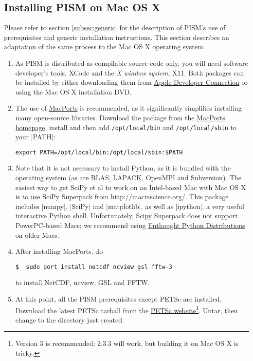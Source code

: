 \documentclass[11pt,final]{amsart}
\begin{document}
\clearpage
\subsection{Installing PISM on Mac OS X}  \label{subsec:macosx}

Please refer to section \ref{subsec:generic} for the description of PISM's use of prerequisites and generic installation
instructions. This section describes an adaptation of the same process to the Mac OS X operating system.

\begin{enumerate}
\item As PISM is distributed as compilable source code only, you will need software developer's tools, XCode and the \emph{X
    window system}, X11. Both packages can be installed by either downloading them from
  \href{http://developer.apple.com/tools/xcode/}{Apple Developer Connection} or using the Mac OS X installation DVD.
\item The use of \href{http://www.macports.org/}{MacPorts} is recommended, as it significantly simplifies installing many
  open-source libraries. Download the package from the \href{http://www.macports.org/install.php}{MacPorts homepage}, install and
  then add \verb|/opt/local/bin| and \verb|/opt/local/sbin| to your |PATH|:
\begin{verbatim}
export PATH=/opt/local/bin:/opt/local/sbin:$PATH
\end{verbatim}
\item Note that it is not necessary to install Python, as it is bundled with the operating system (as are BLAS, LAPACK, OpenMPI and
  Subversion). The easiest way to get SciPy et al to work on an Intel-based Mac with Mac OS X is to use SciPy Superpack from
  \url{http://macinscience.org/}. This package includes |numpy|, |SciPy| and |matplotlib|, as well as |ipython|, a very useful
  interactive Python shell. Unfortunately, Scipy Superpack does not support PowerPC-based Macs; we recommend using  \href{http://www.enthought.com/}{Enthought Python Distributions} on older Macs.
\item After installing MacPorts, do
\begin{verbatim}
$  sudo port install netcdf ncview gsl fftw-3
\end{verbatim}
to install NetCDF, ncview, GSL and FFTW.
\item At this point, all the PISM prerequisites except PETSc are installed. Download the latest PETSc tarball from the
  \href{ftp://ftp.mcs.anl.gov/pub/petsc/release-snapshots/}{PETSc website}\footnote{Version 3 is recommended; 2.3.3 will work, but building it on Mac OS X is tricky.}. Untar, then change to the directory just created.

\end{enumerate}
\end{document}
